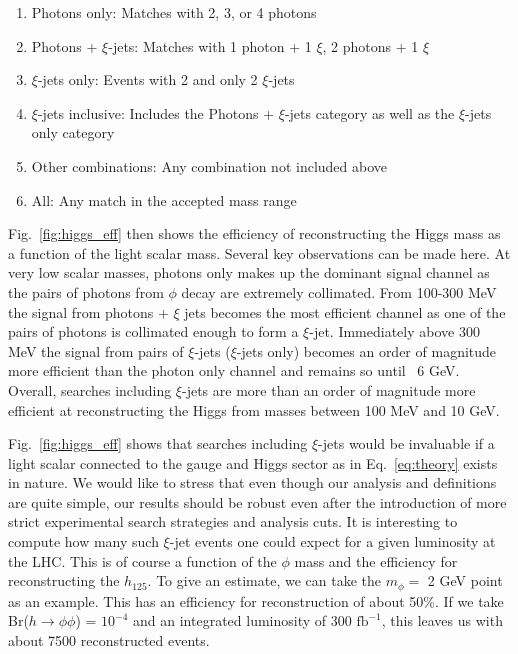 \documentclass[letter,12pt]{article}
\begin{document}
\begin{enumerate}
\item Photons only: Matches with 2, 3, or 4 photons
\item Photons + $\xi$-jets: Matches with 1 photon + 1 $\xi$, 2 photons + 1 $\xi$
\item $\xi$-jets only: Events with 2 and only 2 $\xi$-jets
\item $\xi$-jets inclusive: Includes the Photons + $\xi$-jets category as well as the $\xi$-jets only category
\item Other combinations: Any combination not included above
\item All: Any match in the accepted mass range
\end{enumerate}

Fig.~\ref{fig:higgs_eff} then shows the efficiency of reconstructing the Higgs mass as a function of the light scalar mass. Several key observations can be made here. At very low scalar masses, photons only makes up the dominant signal channel as the pairs of photons from $\phi$ decay are extremely collimated. From 100-300 MeV the signal from photons + $\xi$ jets becomes the most efficient channel as one of the pairs of photons is collimated enough to form a $\xi$-jet. Immediately above 300 MeV the signal from pairs of $\xi$-jets ($\xi$-jets only) becomes an order of magnitude more efficient than the photon only channel and remains so until ~6 GeV. Overall, searches including $\xi$-jets are more than an order of magnitude more efficient at reconstructing the Higgs from masses between 100 MeV and 10 GeV. 

Fig.~\ref{fig:higgs_eff} shows that searches including $\xi$-jets would be invaluable if a light scalar connected to the gauge and Higgs sector as in Eq.~\ref{eq:theory} exists in nature. We would like to stress that even though our analysis and definitions are quite simple, our results should be robust even after the introduction of more strict experimental search strategies and analysis cuts. It is interesting to compute how many such $\xi$-jet events one could expect for a given luminosity at the LHC. This is of course a function of the $\phi$ mass and the efficiency for reconstructing the $h_{125}$. To give an estimate, we can take the $m_{\phi} =$ 2 GeV point as an example. This has an efficiency for reconstruction of about 50\%. If we take Br($h\to\phi\phi$) = $10^{-4}$ and an integrated luminosity of $300\text{ fb}^{-1}$, this leaves us with about 7500 reconstructed events.
\end{document}
